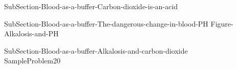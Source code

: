 \documentclass[main.tex]{subfiles}
\begin{document}
\sloppy
\begin{description}
\item[] {SubSection-Blood-as-a-buffer-Carbon-dioxide-is-an-acid}
\item[] 
{SubSection-Blood-as-a-buffer-The-dangerous-change-in-blood-PH}
  {Figure-Alkalosis-and-PH}
\item[] 
{SubSection-Blood-as-a-buffer-Alkalosis-and-carbon-dioxide}
   {SampleProblem20}
 \end{description}
 
 
 
\end{document}
